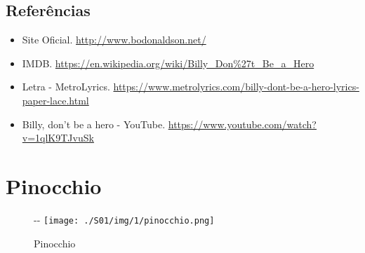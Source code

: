 \hypertarget{referuxeancias-6}{%
\subsection{Referências}\label{referuxeancias-6}}

\begin{itemize}
\tightlist
\item
  \sloppy Site Oficial. \url{http://www.bodonaldson.net/}
\item
  \sloppy IMDB. \url{https://en.wikipedia.org/wiki/Billy_Don%27t_Be_a_Hero}
\item
  \sloppy Letra - MetroLyrics. \url{https://www.metrolyrics.com/billy-dont-be-a-hero-lyrics-paper-lace.html}
\item
  \sloppy Billy, don’t be a hero - YouTube. \url{https://www.youtube.com/watch?v=1qlK9TJvuSk}
\end{itemize}

\hypertarget{pinocchio}{%
\section{Pinocchio}\label{pinocchio}}

\begin{figure}[!ht]
  \begin{adjustwidth}{-\oddsidemargin-1in}{-\rightmargin}
    \centering
    \texttt{[image: ./S01/img/1/pinocchio.png]}
    \caption{Pinocchio\label{fig:pinocchio}}
  \end{adjustwidth}
\end{figure}

